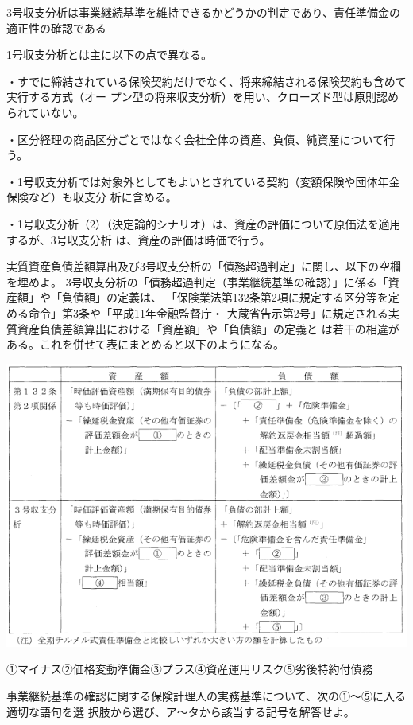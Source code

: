 \documentclass[report,gutter=10mm,fore-edge=10mm,uplatex,dvipdfmx]{jlreq}
\begin{document}
3号収支分析は事業継続基準を維持できるかどうかの判定であり、責任準備金の適正性の確認である

1号収支分析とは主に以下の点で異なる。

・すでに締結されている保険契約だけでなく、将来締結される保険契約も含めて実行する方式（オー
プン型の将来収支分析）を用い、クローズド型は原則認められていない。

・区分経理の商品区分ごとではなく会社全体の資産、負債、純資産について行う。

・1号収支分析では対象外としてもよいとされている契約（変額保険や団体年金保険など）も収支分
析に含める。

・1号収支分析（2）（決定論的シナリオ）は、資産の評価について原価法を適用するが、3号収支分析
は、資産の評価は時価で行う。


実質資産負債差額算出及び3号収支分析の「債務超過判定」に関し、以下の空欄を埋めよ。
3号収支分析の「債務超過判定（事業継続基準の確認）」に係る「資産額」や「負債額」の定義は、
「保険業法第132条第2項に規定する区分等を定める命令」第3条や「平成11年金融監督庁・
大蔵省告示第2号」に規定される実質資産負債差額算出における「資産額」や「負債額」の定義と
は若干の相違がある。これを併せて表にまとめると以下のようになる。

\includegraphics[scale=0.8]{./images/ProbH19-2-1-2.png}

\answer{}
①マイナス②価格変動準備金③プラス④資産運用リスク⑤劣後特約付債務


事業継続基準の確認に関する保険計理人の実務基準について、次の①〜⑤に入る適切な語句を選
択肢から選び、ア〜タから該当する記号を解答せよ。
\end{document}
